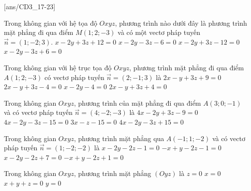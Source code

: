 
[ans/CD3_17-23]
\TN

\begin{ex}%
	Trong không gian với hệ tọa độ $O x y z$, phương trình nào dưới đây là phương trình mặt phẳng đi qua điểm $M(1 ; 2 ;-3)$ và có một vectơ pháp tuyến $\vec{n}=(1 ;-2 ; 3)$.
	\choice
	{\True $x-2 y+3 z+12=0$}
	{$x-2 y-3 z-6=0$}
	{$x-2 y+3 z-12=0$}
	{$x-2 y-3 z+6=0$}
\end{ex}
\begin{ex}%
	Trong không gian với hệ trục tọa độ $Oxyz$, phương trình mặt phẳng đi qua điểm $A(1 ; 2 ;-3)$ có vectơ pháp tuyến $\vec{n}=(2 ;-1 ; 3)$ là
	\choice
	{\True $2 x-y+3 z+9=0$}
	{$2 x-y+3 z-4=0$}
	{$x-2 y-4=0$}
	{$2 x-y+3 z+4=0$}
\end{ex}

\begin{ex}%
	Trong không gian $O x y z$, phương trình của mặt phẳng đi qua điểm $A(3 ; 0 ;-1)$ và có vectơ pháp tuyến $\vec{n}=(4 ;-2 ;-3)$ là
	\choice
	{$4x-2 y+3z-9=0$}
	{\True $4x-2y-3z-15=0$}
	{$3x-z-15=0$}
	{$4x-2y-3z+15=0$}
\end{ex}

\begin{ex}%
	Trong không gian $Oxyz$, phương trình mặt phẳng qua $A(-1 ; 1 ;-2)$ và có vectơ  pháp tuyến $\vec{n}=(1 ;-2 ;-2)$ là
	\choice
	{\True $x-2 y-2 z-1=0$}
	{$-x+y-2z-1=0$}
	{$x-2y-2z+7=0$}
	{$-x+y-2z+1=0$}
\end{ex}

\begin{ex}%
	Trong không gian $Oxyz$, phương trình mặt phẳng $(Oyz)$ là
	\choice
	{$z=0$}
	{\True $x=0$}
	{$x+y+z=0$}
	{$y=0$}
\end{ex}

